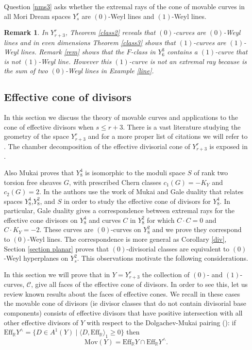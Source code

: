 \documentclass[12pt]{article}
\newtheorem{remark}[equation]{Remark}
\numberwithin{equation}{section}
\numberwithin{subeq}{equation}
\begin{document}
Question \ref{nms3} asks whether the extremal rays of the cone of movable curves 
in all Mori Dream spaces $Y^r_{s}$ are $(0)$-Weyl lines and $(1)$-Weyl lines.
\begin{remark}
In $Y^r_{r+3}$, Theorem \ref{class2} reveals that $(0)$-curves are $(0)$-Weyl lines
and in even dimensions Theorem \ref{class3} shows that $(1)$-curves are $(1)$-Weyl lines. 
Remark \ref{rem} shows that 
the $F$-class in $Y^3_6$ contains a $(1)$-curve that is not $(1)$-Weyl line. 
However this $(1)$-curve is not an extremal ray because is the sum of two $(0)$-Weyl lines in Example \ref{line}.
\end{remark}

\subsection{Effective cone of divisors}\label{cone}
In this section we discuss the theory of movable curves
and applications to the cone of effective divisors when $s\leq r+3$.
There is a vast literature studying the geometry of the space $Y^r_{r+3}$
and for a more proper list of citations we will refer to \cite[Section 0]{DP}.
The chamber decomposition of the effective divisorial cone of $Y^r_{r+3}$
is exposed in \cite{AC}.

Also Mukai proves that $Y^4_8$ is isomorphic to
the moduli space $S$ of rank two torsion free sheaves $G$,
with prescribed Chern classes $c_1(G)= - K_Y$ and $c_2(G)=2$.
In \cite{Cas2} the authors use the work of Mukai and Gale duality
that relates spaces $Y^4_8$,$ Y^2_8$, and $S$
in order to study the effective cone of divisors for $Y^4_8$.
In particular, Gale duality gives a correspondence between extremal rays for the effective cone divisors on $Y^4_8$ 
and curves $C$ in $Y^2_8$ for which $C \cdot C=0$ and $C \cdot K_Y= -2$.
These curves are $(0)$-curves on $Y^2_8$
and we prove they correspond to $(0)$-Weyl lines.
The correspondence is more general as Corollary \eqref{div}, Section \ref{section planar}
proves that $(0)$-divisorial classes are equivalent to $(0)$-Weyl hyperplanes on $Y^2_s$. This observations motivate the following considerations.

In this section we will prove that in $Y=Y^r_{r+3}$
the collection of $(0)$- and $(1)$-curves, $\mathcal{C}$,
give all faces of the effective cone of divisors.
In order to see this,
let us review known results about the faces of effective cones.
We recall in these cases the movable cone of divisors
(ie divisor classes that do not contain divisorial base components)
consists of effective divisors
that have positive intersection with all other effective divisors of $Y$
with respect to the Dolgachev-Mukai pairing (\cite[Theorem 4.7]{D}):
if ${\text{Eff}_{\mathbb{R}} Y}^{\wedge}
= \{D \in A^1(Y) \;|\; \langle D, \text{Eff}_{\mathbb{R}} \rangle_1 \geq 0\}$
then
\[
\text{Mov}(Y)=\text{Eff}_{\mathbb{R}} Y \cap {\text{Eff}_{\mathbb{R}} Y}^{\wedge}.
\]
\end{document}
